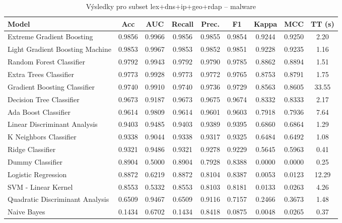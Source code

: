 \begin{table}[H]
  \centering
  \small
  \caption{Výsledky pro subset lex+dns+ip+geo+rdap – malware}
  \begin{tabular}{|l|c|c|c|c|c|c|c|c|}
    \hline
    \textbf{Model} & \textbf{Acc} & \textbf{AUC} & \textbf{Recall} & \textbf{Prec.} & \textbf{F1} & \textbf{Kappa} & \textbf{MCC} & \textbf{TT (s)} \\
    \hline
    Extreme Gradient Boosting & 0.9856 & 0.9966 & 0.9856 & 0.9855 & 0.9854 & 0.9244 & 0.9250 & 2.20 \\
    Light Gradient Boosting Machine & 0.9853 & 0.9967 & 0.9853 & 0.9852 & 0.9851 & 0.9228 & 0.9235 & 1.16 \\
    Random Forest Classifier & 0.9792 & 0.9943 & 0.9792 & 0.9790 & 0.9785 & 0.8862 & 0.8894 & 1.51 \\
    Extra Trees Classifier & 0.9773 & 0.9928 & 0.9773 & 0.9772 & 0.9765 & 0.8753 & 0.8791 & 1.75 \\
    Gradient Boosting Classifier & 0.9740 & 0.9910 & 0.9740 & 0.9736 & 0.9729 & 0.8563 & 0.8605 & 33.55 \\
    Decision Tree Classifier & 0.9673 & 0.9187 & 0.9673 & 0.9675 & 0.9674 & 0.8332 & 0.8333 & 2.17 \\
    Ada Boost Classifier & 0.9614 & 0.9809 & 0.9614 & 0.9601 & 0.9603 & 0.7918 & 0.7936 & 7.64 \\
    Linear Discriminant Analysis & 0.9403 & 0.9485 & 0.9403 & 0.9389 & 0.9395 & 0.6860 & 0.6864 & 1.29 \\
    K Neighbors Classifier & 0.9338 & 0.9044 & 0.9338 & 0.9317 & 0.9325 & 0.6484 & 0.6492 & 1.08 \\
    Ridge Classifier & 0.9321 & 0.9486 & 0.9321 & 0.9278 & 0.9229 & 0.5645 & 0.5963 & 0.41 \\
    Dummy Classifier & 0.8904 & 0.5000 & 0.8904 & 0.7928 & 0.8388 & 0.0000 & 0.0000 & 0.25 \\
    Logistic Regression & 0.8872 & 0.6219 & 0.8872 & 0.8104 & 0.8387 & 0.0053 & 0.0123 & 12.29 \\
    SVM - Linear Kernel & 0.8553 & 0.5332 & 0.8553 & 0.8103 & 0.8181 & 0.0133 & 0.0263 & 4.26 \\
    Quadratic Discriminant Analysis & 0.6509 & 0.9467 & 0.6509 & 0.9116 & 0.7157 & 0.2466 & 0.3673 & 1.48 \\
    Naive Bayes & 0.1434 & 0.6702 & 0.1434 & 0.8418 & 0.0875 & 0.0048 & 0.0265 & 0.37 \\
    \hline
  \end{tabular}
\end{table}
\vspace{0.5cm}

